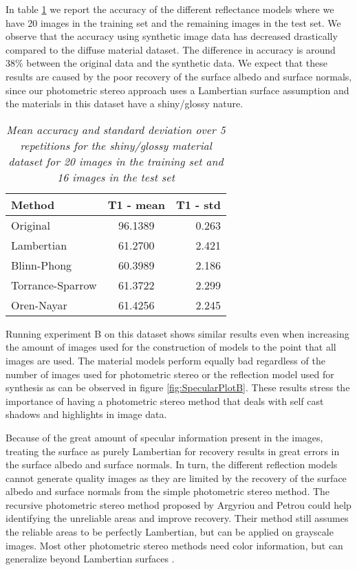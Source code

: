 In table \ref{tab:SpecularResultsA} we report the accuracy of the different reflectance models where we have 20 images in the training set and the remaining images in the test set. We observe that the accuracy using synthetic image data has decreased drastically compared to the diffuse material dataset. The difference in accuracy is around 38\% between the original data and the synthetic data. We expect that these results are caused by the poor recovery of the surface albedo and surface normals, since our photometric stereo approach uses a Lambertian surface assumption and the materials in this dataset have a shiny/glossy nature. 

\begin{table}
	\center
	\begin{tabular}{l|c|r}
	Method 				&	T1 - mean & T1 - std \\
	\hline
	Original			&	96.1389 & 0.263 \\
	Lambertian 			&	61.2700 & 2.421 \\
	Blinn-Phong 		& 	60.3989 & 2.186 \\
	Torrance-Sparrow 	&	61.3722 & 2.299 \\
	Oren-Nayar 			&	61.4256 & 2.245 \\
	\end{tabular}
	\caption{{\it Mean accuracy and standard deviation over 5 repetitions for the shiny/glossy material dataset for 20 images in the training set and 16 images in the test set}}
	\label{tab:SpecularResultsA}
\end{table}

Running experiment B on this dataset shows similar results even when increasing the amount of images used for the construction of models to the point that all images are used. The material models perform equally bad regardless of the number of images used for photometric stereo or the reflection model used for synthesis as can be observed in figure \ref{fig:SpecularPlotB}. These results stress the importance of having a photometric stereo method that deals with self cast shadows and highlights in image data. 

Because of the great amount of specular information present in the images, treating the surface as purely Lambertian for recovery results in great errors in the surface albedo and surface normals. In turn, the different reflection models cannot generate quality images as they are limited by the recovery of the surface albedo and surface normals from the simple photometric stereo method. The recursive photometric stereo method proposed by Argyriou and Petrou \cite{RecursivePS} could help identifying the unreliable areas and improve recovery. Their method still assumes the reliable areas to be perfectly Lambertian, but can be applied on grayscale images. Most other photometric stereo methods need color information, but can generalize beyond Lambertian surfaces \cite{ConsensusPS}.

